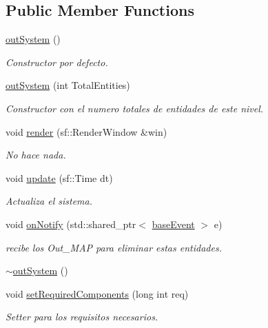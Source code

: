 \subsection*{Public Member Functions}
\begin{DoxyCompactItemize}
\item 
\hyperlink{classant_1_1out_system_a00ea0c5eaf0b42527c915be9e56fcf85}{out\+System} ()
\begin{DoxyCompactList}\small\item\em Constructor por defecto. \end{DoxyCompactList}\item 
\hyperlink{classant_1_1out_system_a27193e3afe67730fa27ef0a14fd29723}{out\+System} (int Total\+Entities)
\begin{DoxyCompactList}\small\item\em Constructor con el numero totales de entidades de este nivel. \end{DoxyCompactList}\item 
void \hyperlink{classant_1_1out_system_a927f6a7835daf68ca49b401045e3ec1d}{render} (sf\+::\+Render\+Window \&win)
\begin{DoxyCompactList}\small\item\em No hace nada. \end{DoxyCompactList}\item 
void \hyperlink{classant_1_1out_system_a7d0732d434eaf926b5c0674e24e9680c}{update} (sf\+::\+Time dt)
\begin{DoxyCompactList}\small\item\em Actualiza el sistema. \end{DoxyCompactList}\item 
void \hyperlink{classant_1_1out_system_aecb7dfd3738e303f975d28ca03165c4d}{on\+Notify} (std\+::shared\+\_\+ptr$<$ \hyperlink{classant_1_1base_event}{base\+Event} $>$ e)
\begin{DoxyCompactList}\small\item\em recibe los Out\+\_\+\+M\+A\+P para eliminar estas entidades. \end{DoxyCompactList}\item 
\hyperlink{classant_1_1out_system_a7a2493d07f8d7b4b2f5858f326a540fc}{$\sim$out\+System} ()
\item 
void \hyperlink{classant_1_1_system_a35662ff3739ff4290df1106bfdccfaca}{set\+Required\+Components} (long int req)
\begin{DoxyCompactList}\small\item\em Setter para los requisitos necesarios. \end{DoxyCompactList}\item 

\end{DoxyCompactItemize}
